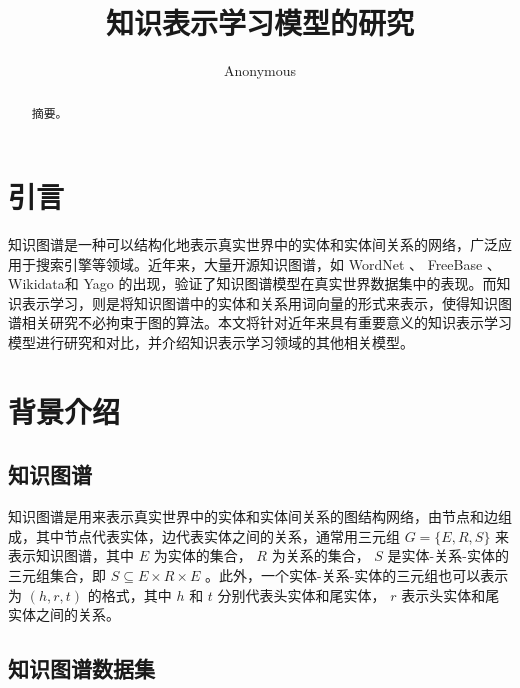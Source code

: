 \documentclass{llncs}
\begin{document}
\title{知识表示学习模型的研究}
\author{Anonymous}
\maketitle

\begin{abstract}

摘要。


\end{abstract}

\section{引言}

知识图谱\cite{DBLP:journals/pieee/Nickel0TG16}是一种可以结构化地表示真实世界中的实体和实体间关系的网络，广泛应用于搜索引擎等领域。近年来，大量开源知识图谱，如 WordNet\cite{Miller:1995:WLD:219717.219748} 、 FreeBase\cite{Bollacker:2008:FCC:1376616.1376746} 、Wikidata\cite{42240}和 Yago\cite{suchanek2007yago} 的出现，验证了知识图谱模型在真实世界数据集中的表现。而知识表示学习\cite{DBLP:journals/corr/abs-1812-10901}，则是将知识图谱中的实体和关系用词向量的形式来表示，使得知识图谱相关研究不必拘束于图的算法。本文将针对近年来具有重要意义的知识表示学习模型进行研究和对比，并介绍知识表示学习领域的其他相关模型。

\section{背景介绍}

\subsection{知识图谱}

知识图谱是用来表示真实世界中的实体和实体间关系的图结构网络，由节点和边组成，其中节点代表实体，边代表实体之间的关系，通常用三元组 $G=\{E,R,S\}$ 来表示知识图谱，其中 $E$ 为实体的集合， $R$ 为关系的集合， $S$ 是实体-关系-实体的三元组集合，即 $S\subseteq{E×R×E}$ 。此外，一个实体-关系-实体的三元组也可以表示为 $(h,r,t)$ 的格式，其中 $h$ 和 $t$ 分别代表头实体和尾实体， $r$ 表示头实体和尾实体之间的关系。

\subsection{知识图谱数据集}
\end{document}

